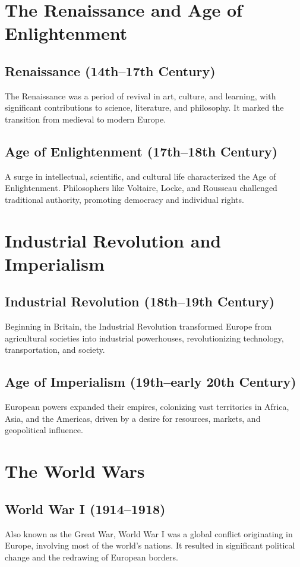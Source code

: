 \documentclass[a4paper,12pt]{book}
\begin{document}
\section{The Renaissance and Age of Enlightenment}
\label{sec:renaissance-enlightenment}
\subsection{Renaissance (14th–17th Century)}
The Renaissance was a period of revival in art, culture, and learning, with significant contributions to science, literature, and philosophy. It marked the transition from medieval to modern Europe.

\subsection{Age of Enlightenment (17th–18th Century)}
A surge in intellectual, scientific, and cultural life characterized the Age of Enlightenment. Philosophers like Voltaire, Locke, and Rousseau challenged traditional authority, promoting democracy and individual rights.

\section{Industrial Revolution and Imperialism}
\label{sec:industrial-revolution-imperialism}
\subsection{Industrial Revolution (18th–19th Century)}
Beginning in Britain, the Industrial Revolution transformed Europe from agricultural societies into industrial powerhouses, revolutionizing technology, transportation, and society.

\subsection{Age of Imperialism (19th–early 20th Century)}
European powers expanded their empires, colonizing vast territories in Africa, Asia, and the Americas, driven by a desire for resources, markets, and geopolitical influence.

\section{The World Wars}
\label{sec:world-wars}
\subsection{World War I (1914–1918)}
Also known as the Great War, World War I was a global conflict originating in Europe, involving most of the world’s nations. It resulted in significant political change and the redrawing of European borders.
\end{document}
